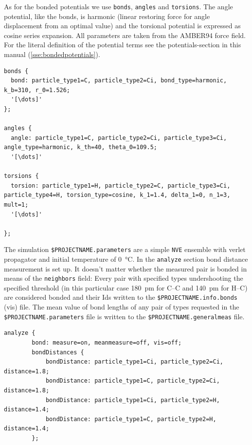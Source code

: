 As for the bonded potentials we use \texttt{bonds}, \texttt{angles} and
\texttt{torsions}. The angle potential, like the bonds, is harmonic
(linear restoring force for angle displacement from an optimal value)
and the torsional potential is expressed as cosine series expansion. All
parameters are taken from the AMBER94 force field. For the literal
definition of the potential terms see the potentials-section in this
manual (\ref{sse:bondedpotentials}).

\begin{lstlisting}[escapechar=', caption=Excerpt from the
    .potentials file]
bonds {
  bond: particle_type1=C, particle_type2=Ci, bond_type=harmonic, k_b=310, r_0=1.526;
  '[\dots]'
};

angles {
  angle: particle_type1=C, particle_type2=Ci, particle_type3=Ci, angle_type=harmonic, k_th=40, theta_0=109.5;
  '[\dots]'

torsions {
  torsion: particle_type1=H, particle_type2=C, particle_type3=Ci, particle_type4=H, torsion_type=cosine, k_1=1.4, delta_1=0, n_1=3, mult=1;
  '[\dots]'

};
\end{lstlisting}

The simulation \texttt{\$PROJECTNAME.parameters} are a simple \texttt{NVE} ensemble
with verlet propagator and initial temperature of \SI{0}{\celsius}. In the
\texttt{analyze} section bond distance measurement is set up. It
doesn't matter whether the measured pair is bonded in means of the
\texttt{neighbors} field: Every pair with specified types undershooting the
specified threshold (in this particular case \SI{180}{\pico\meter} for C--C and
\SI{140}{\pico\meter} for H--C) are considered bonded and their Ids written to the
\texttt{\$PROJECTNAME.info.bonds} (vis) file. The mean value of bond lengths of any 
pair of types requested in the \texttt{\$PROJECTNAME.parameters} file is written to 
the \texttt{\$PROJECTNAME.generalmeas} file.

\begin{lstlisting}[caption=Excerpt from the .parameters file]
    analyze {
        bond: measure=on, meanmeasure=off, vis=off;
        bondDistances {
            bondDistance: particle_type1=Ci, particle_type2=Ci, distance=1.8;
            bondDistance: particle_type1=C, particle_type2=Ci, distance=1.8;
            bondDistance: particle_type1=Ci, particle_type2=H, distance=1.4;
            bondDistance: particle_type1=C, particle_type2=H, distance=1.4;
        };
\end{lstlisting}

